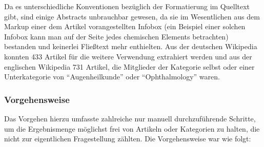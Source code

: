 \documentclass[pagesize,DIV=calc,12pt,final]{scrreprt}
\begin{document}
Da es unterschiedliche Konventionen bezüglich der Formatierung im Quelltext gibt, sind einige Abstracts unbrauchbar gewesen, da sie im Wesentlichen aus dem Markup einer dem Artikel vorangestellten Infobox (ein Beispiel einer solchen Infobox kann man auf der Seite jedes chemischen Elements betrachten) bestanden und keinerlei Fließtext mehr enthielten. 
Aus der deutschen Wikipedia konnten 433 Artikel für die weitere Verwendung extrahiert werden und aus der englischen Wikipedia 731 Artikel, die Mitglieder der Kategorie selbst oder einer Unterkategorie von \enquote{Augenheilkunde} oder \enquote{Ophthalmology} waren. 

\subsubsection{Vorgehensweise}

Das Vorgehen hierzu umfasste zahlreiche nur manuell durchzuführende Schritte, um die Ergebnismenge möglichst frei von Artikeln oder Kategorien zu halten, die nicht zur eigentlichen Fragestellung zählten. 
Die Vorgehensweise war wie folgt: 
\end{document}

